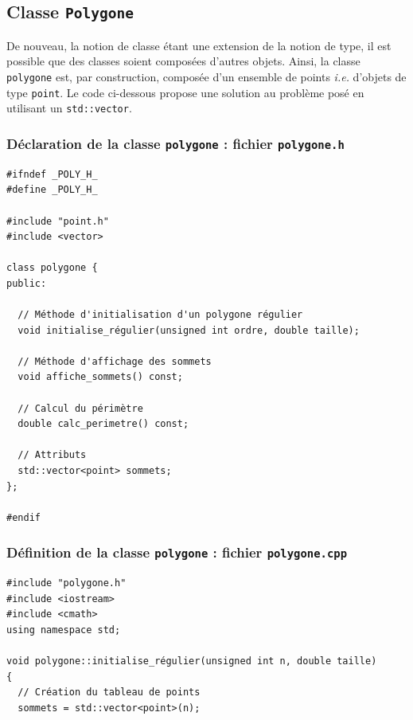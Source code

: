 \documentclass{book}
\newcommand{\inline}[1]{\texttt{#1}}
\begin{document}
\begin{correction}

\subsection*{Classe \texttt{Polygone}}

De nouveau, la notion de classe étant une extension de la notion de type, il est
possible que des classes soient composées d'autres objets. Ainsi, la classe
\texttt{polygone} est, par construction, composée d'un ensemble de points \emph{i.e.} d'objets
de type \texttt{point}. Le code ci-dessous propose une solution au problème posé en
utilisant un \inline{std::vector}.

\subsubsection*{Déclaration de la classe \texttt{polygone} : fichier \texttt{polygone.h}}

\begin{verbatim}
#ifndef _POLY_H_
#define _POLY_H_

#include "point.h"
#include <vector>

class polygone {
public:

  // Méthode d'initialisation d'un polygone régulier
  void initialise_régulier(unsigned int ordre, double taille);

  // Méthode d'affichage des sommets
  void affiche_sommets() const;

  // Calcul du périmètre
  double calc_perimetre() const;

  // Attributs
  std::vector<point> sommets;
};

#endif
\end{verbatim}

\subsubsection*{Définition de la classe \texttt{polygone} : fichier \texttt{polygone.cpp}}

\begin{verbatim}
#include "polygone.h"
#include <iostream>
#include <cmath>
using namespace std;

void polygone::initialise_régulier(unsigned int n, double taille)
{
  // Création du tableau de points
  sommets = std::vector<point>(n);


\end{verbatim}
\end{correction}
\end{document}
